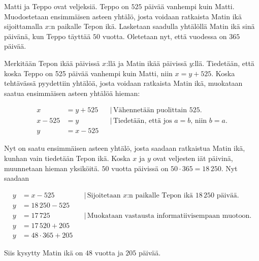 \begin{esimerkki} 
Matti ja Teppo ovat veljeksiä. Teppo on $525$ päivää vanhempi kuin Matti. Muodostetaan ensimmäisen asteen yhtälö, josta voidaan ratkaista Matin ikä sijoittamalla $x$:n paikalle Tepon ikä. Lasketaan saadulla yhtälöllä Matin ikä sinä päivänä, kun Teppo täyttää $50$ vuotta. Oletetaan nyt, että vuodessa on $365$ päivää.

Merkitään Tepon ikää päivissä $x$:llä ja Matin ikää päivissä $y$:llä. Tiedetään, että koska Teppo on 525 päivää vanhempi kuin Matti, niin $x=y+525$. Koska tehtävässä pyydettiin yhtälöä, josta voidaan ratkaista Matin ikä, muokataan saatua ensimmäisen asteen yhtälöä hieman:

      \begin{align*}
	   x &= y+525 & &| \, \text{Vähennetään puolittain 525.} \\
	   x-525 &= y & &| \, \text{Tiedetään, että jos $a=b$, niin $b=a$.} \\
	   y &= x-525 & &
      \end{align*}
      
Nyt on saatu ensimmäisen asteen yhtälö, josta saadaan ratkaistua Matin ikä, kunhan vain tiedetään Tepon ikä. Koska $x$ ja $y$ ovat veljesten iät päivinä, muunnetaan hieman yksiköitä. $50$ vuotta päivissä on $50 \cdot 365 = 18\,250$. Nyt saadaan

      \begin{align*}
	  y &= x-525 & &| \, \text{Sijoitetaan $x$:n paikalle Tepon ikä $18\,250$ päivää.} \\
	  y &= 18\,250-525 & & \\
	  y &= 17\,725 & &| \, \text{Muokataan vastausta informatiivisempaan muotoon.} \\
	  y &= 17\,520+205 & & \\
	  y &= 48 \cdot 365 +205 & &
      \end{align*}
      
      Siis kysytty Matin ikä on $48$ vuotta ja $205$ päivää.
  
\end{esimerkki}


